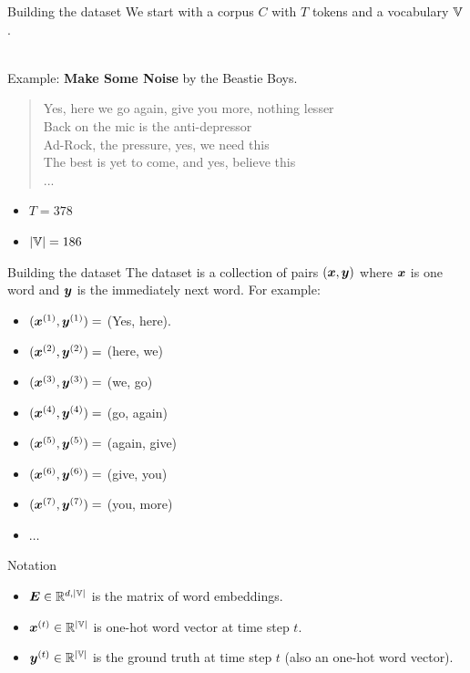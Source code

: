 \documentclass[10pt]{beamer}
\begin{document}
\begin{frame}{Building the dataset}
We start with a corpus $C$ with $T$ tokens and a vocabulary $\mathbb{V}$.\\\

Example: \textbf{Make Some Noise} by the Beastie Boys.\\

\begin{quote}
\alert{Yes, here we go again, give you more, nothing lesser\\
Back on the mic is the anti-depressor\\
Ad-Rock, the pressure, yes, we need this\\
The best is yet to come, and yes, believe this\\
... \\}
\end{quote}

\begin{itemize}
\item $T = 378$
\item $|\mathbb{V}| = 186$
\end{itemize}

\end{frame}

\begin{frame}{Building the dataset}
The dataset is a collection of pairs $(\bm{x},\bm{y})$ where $\bm{x}$ is one word and $\bm{y}$ is the immediately next word. For example:
\begin{itemize}
\item [] $(\bm{x}^{(1)}, \bm{y}^{(1)}) =$ (Yes, here).
\item [] $(\bm{x}^{(2)}, \bm{y}^{(2)}) =$ (here, we)
\item [] $(\bm{x}^{(3)}, \bm{y}^{(3)}) =$ (we, go)
\item [] $(\bm{x}^{(4)}, \bm{y}^{(4)}) =$ (go, again)
\item [] $(\bm{x}^{(5)}, \bm{y}^{(5)}) =$ (again, give)
\item [] $(\bm{x}^{(6)}, \bm{y}^{(6)}) =$ (give, you)
\item [] $(\bm{x}^{(7)}, \bm{y}^{(7)}) =$ (you, more)
\item [] $\dots$
\end{itemize}
\end{frame}

\begin{frame}{Notation}
\begin{itemize}
\item $\bm{E} \in \mathbb{R}^{d,|\mathbb{V}|}$ is the matrix of word embeddings.
\vspace{0.3cm}
\item $\bm{x}^{(t)} \in \mathbb{R}^{|\mathbb{V}|}$ is one-hot word vector at time step $t$.
\vspace{0.3cm}
\item $\bm{y}^{(t)} \in \mathbb{R}^{|\mathbb{V}|}$ is the ground truth at time step $t$ (also an one-hot word vector).
\end{itemize}
\end{frame}
\end{document}
